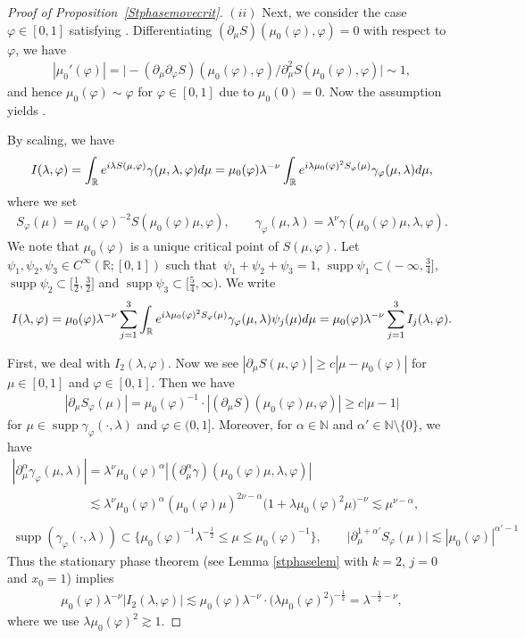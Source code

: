 \documentclass[10pt,a4paper]{article}
\numberwithin{equation}{section}
\def\R{\mathbb{R}}%
\DeclareMathOperator{\supp}{supp}%
\def\a{\alpha}
\def\c{\gamma}
\def\f{\varphi}
\def\g{\psi}
\def\l{\lambda}
\def\m{\mu}
\def\n{\nu}
\def\pa{\partial}
\begin{document}
\begin{proof}[Proof of Proposition~\ref{Stphasemovecrit}]
 $(ii)$ Next, we consider the case $\f\in [0,1]$ satisfying \smash{$\m_0(\f)\in \bigl[ 2^{-1}\l^{-\frac{1}{2}}, 1\bigr]$}.
Differentiating $(\pa_{\m}S)(\m_0(\f),\f)=0$ with respect to $\f$, we have
\begin{align*}
|\m_0'(\f)|=\bigl|-(\pa_{\m}\pa_{\f}S)(\m_0(\f),\f)/\pa_{\m}^2S(\m_0(\f),\f)\bigr|\sim 1,
\end{align*}
and hence $\m_0(\f)\sim \f$ for $\f\in [0,1]$ due to $\m_0(0)=0$. Now the assumption \smash{$\m_0(\f)\geq 2^{-1}\l^{-\frac{1}{2}}$} yields \smash{$\f\gtrsim \l^{-\frac{1}{2}}$}.

By scaling, we have
\begin{align*}
I(\l,\f)=\int_{\R}{\rm e}^{{\rm i}\l S(\m,\f)}\c(\m,\l,\f){\rm d}\m=\m_0(\f)\l^{-\n}\int_{\R}{\rm e}^{{\rm i}\l \m_0(\f)^2S_{\f}(\m)}\c_{\f}(\m,\l){\rm d}\m,
\end{align*}
where we set
\begin{align*}
S_{\f}(\m)=\m_0(\f)^{-2}S(\m_0(\f)\m,\f),\qquad \c_{\f}(\m,\l)=\l^{\n}\c(\m_0(\f)\m,\l,\f).
\end{align*}
We note that $\m_0(\f)$ is a unique critical point of $S(\m,\f)$.
Let $\g_1,\g_2,\g_3\in C^{\infty}(\R;[0,1])$ such that~${\g_1+\g_2+\g_3=1}$, $\supp \g_1\subset \bigl(-\infty,\frac{3}{4}\bigr]$, $\supp \g_2\subset \bigl[\frac{1}{2},\frac{3}{2}\bigr]$ and $\supp \g_3\subset \bigl[\frac{5}{4},\infty\bigr)$. We write
\begin{align*}
I(\l,\f)
=\m_0(\f)\l^{-\n}\sum_{j=1}^3\int_{\R}{\rm e}^{{\rm i}\l \m_0(\f)^2S_{\f}(\m)}\c_{\f}(\m,\l)\g_j(\m){\rm d}\m
=\m_0(\f)\l^{-\n}\sum_{j=1}^3I_j(\l,\f).
\end{align*}

First, we deal with $I_2(\l,\f)$.
Now we see $|\pa_{\m}S(\m,\f)|\geq c|\m-\m_0(\f)|$ for $\m\in [0,1]$ and $\f\in [0,1]$. Then we have
\begin{align*}
|\pa_{\m}S_{\f}(\m)|=\m_0(\f)^{-1}\cdot |(\pa_{\m}S)(\m_0(\f)\m,\f)|\geq c|\m-1|
\end{align*}
for $\m\in \supp \c_{\f}(\cdot,\l)$ and $\f\in (0,1]$.
Moreover, for $\a\in\mathbb{N}$ and $\a'\in \mathbb{N}\setminus\{0\}$, we have
\begin{gather*}
|\pa_{\m}^{\a}\c_{\f}(\m,\l)|=\l^{\n} \m_0(\f)^{\a}|(\pa_{\m}^{\a}\c)(\m_0(\f)\m,\l,\f)|\\
\phantom{|\pa_{\m}^{\a}\c_{\f}(\m,\l)|}{}\lesssim \l^{\n}\m_0(\f)^{\a} (\m_0(\f) \m)^{2\n-\a}\bigl(1+\l \m_0(\f)^2 \m\bigr)^{-\n}\lesssim \m^{\n-\a},\\
\supp (\c_{\f}(\cdot,\l))\subset \big\{\m_0(\f)^{-1}\l^{-\frac{1}{2}}\leq \m\leq \m_0(\f)^{-1}\big\},\qquad \big|\pa_{\m}^{1+\a'}S_{\f}(\m)\big|\lesssim |\m_0(\f)|^{\a'-1}
\end{gather*}
Thus the stationary phase theorem (see Lemma \ref{stphaselem} with $k=2$, $j=0$ and $x_0=1$) implies
\begin{align*}
\m_0(\f)\l^{-\n}|I_2(\l,\f)|
\lesssim \m_0(\f)\l^{-\n}\cdot \bigl(\l \m_0(\f)^2\bigr)^{-\frac{1}{2}}=\l^{-\frac{1}{2}-\n},
\end{align*}
where we use $\l \m_0(\f)^2\gtrsim 1$.


\end{proof}
\end{document}
